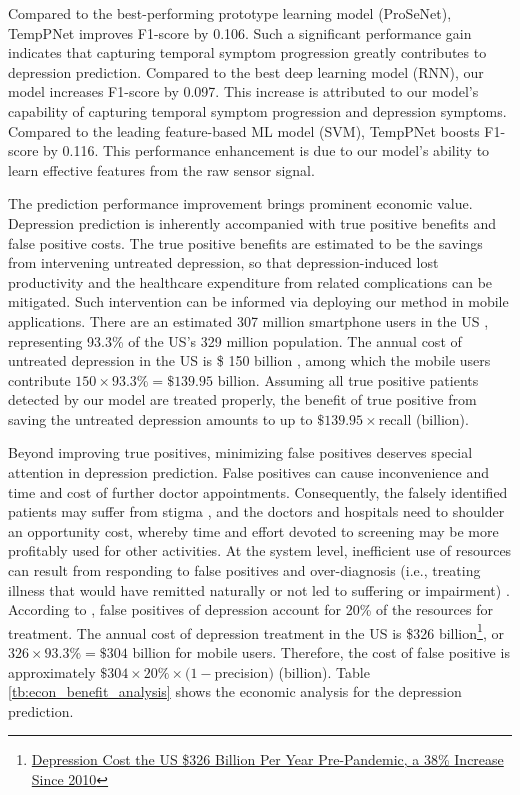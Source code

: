\documentclass[mnsc]{informs3b} %
\begin{document}
Compared to the best-performing prototype learning model (ProSeNet), TempPNet improves F1-score by 0.106. Such a significant performance gain indicates that capturing temporal symptom progression greatly contributes to depression prediction. Compared to the best deep learning model (RNN), our model increases F1-score by 0.097. This increase is attributed to our model's capability of capturing temporal symptom progression and depression symptoms. Compared to the leading feature-based ML model (SVM), TempPNet boosts F1-score by 0.116. This performance enhancement is due to our model's ability to learn effective features from the raw sensor signal.

The prediction performance improvement brings prominent economic value. Depression prediction is inherently accompanied with true positive benefits and false positive costs. The true positive benefits are estimated to be the savings from intervening untreated depression, so that depression-induced lost productivity and the healthcare expenditure from related complications can be mitigated. Such intervention can be informed via deploying our method in mobile applications. There are an estimated 307 million smartphone users in the US \citep{statista_topic_2022}, representing 93.3\% of the US's 329 million population. The annual cost of untreated depression in the US is \$ 150 billion \citep{rampell_half-trillion-dollar_2013}, among which the mobile users contribute $150\times93.3\%=\$139.95$ billion. Assuming all true positive patients detected by our model are treated properly, the benefit of true positive from saving the untreated depression amounts to up to $\$139.95\times$recall (billion).

Beyond improving true positives, minimizing false positives deserves special attention in depression prediction. False positives can cause inconvenience and time and cost of further doctor appointments. Consequently, the falsely identified patients may suffer from stigma \citep{martin_decision_2017}, and the doctors and hospitals need to shoulder an opportunity cost, whereby time and effort devoted to screening may be more profitably used for other activities. At the system level, inefficient use of resources can result from responding to false positives and over-diagnosis (i.e., treating illness that would have remitted naturally or not led to suffering or impairment) \citep{martin_decision_2017}. According to \cite{heslin_cost-effectiveness_2022}, false positives of depression account for 20\% of the resources for treatment. The annual cost of depression treatment in the US is \$326 billion\footnote{\href{https://www.prnewswire.com/news-releases/depression-cost-the-us-326-billion-per-year-pre-pandemic-a-38-increase-since-2010-301284172.htm}{Depression Cost the US \$326 Billion Per Year Pre-Pandemic, a 38\% Increase Since 2010}}, or $326\times93.3\%=\$304$ billion for mobile users. Therefore, the cost of false positive is approximately $\$304\times20\% \times (1-$precision$)$ (billion). Table \ref{tb:econ_benefit_analysis} shows the economic analysis for the depression prediction.
\end{document}
